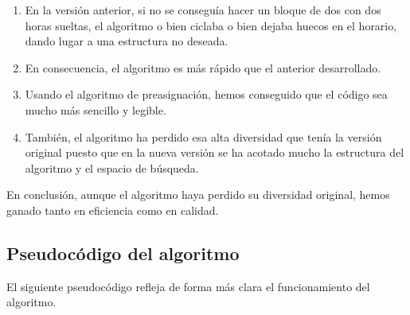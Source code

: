 \begin{enumerate}[$\bullet$]
  \item En la versión anterior, si no se conseguía hacer un bloque de dos con dos horas sueltas, el algoritmo o bien ciclaba o bien dejaba huecos en el horario, dando lugar a una estructura no deseada.
  \item En consecuencia, el algoritmo es más rápido que el anterior desarrollado.
  \item Usando el algoritmo de preasignación, hemos conseguido que el código sea mucho más sencillo y legible.
  \item También, el algoritmo ha perdido esa alta diversidad que tenía la versión original puesto que en la nueva versión se ha acotado mucho la estructura del algoritmo y el espacio de búsqueda.
\end{enumerate}

En conclusión, aunque el algoritmo haya perdido su diversidad original, hemos ganado tanto en eficiencia como en calidad.

\subsection{Pseudocódigo del algoritmo}
El siguiente pseudocódigo refleja de forma más clara el funcionamiento del algoritmo.

